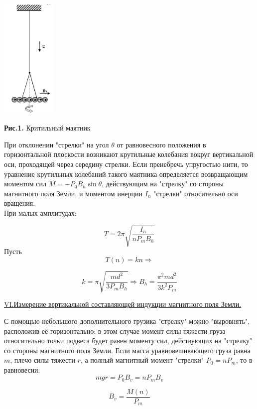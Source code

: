 \documentclass{article}
\begin{document}
\begin{center}
    \includegraphics[width = 0.2\textwidth]{Bhor.png}
    
    \textbf{Рис.1.} Критильный маятник
\end{center}

При отклонении "стрелки" на угол $\theta$ от равновесного положения в горизонтальной плоскости возникают крутильные колебания вокруг вертикальной оси, проходящей через середину стрелки. Если пренебречь упругостью нити, то уравнение крутильных колебаний такого маятника определяется возвращающим моментом сил $M = -P_0B_h \sin \theta$, действующим на "стрелку" со стороны магнитного поля Земли, и моментом инерции $I_n$ "стрелки" относительно оси вращения.\\
При малых амплитудах:

\[T = 2\pi \sqrt{\dfrac{I_n}{nP_mB_h}}\]
Пусть 
\[T(n) = kn \Rightarrow\]

\begin{equation}
    k = \pi \sqrt{\dfrac{md^2}{3P_m B_h}} \Rightarrow B_h = \dfrac{\pi^2md^2}{3k^2P_m}
\end{equation}

\begin{center}
    \underline{\large {\RN{6}.{Измерение вертикальной составляющей индукции магнитного поля Земли.}}}
\end{center}

С помощью небольшого дополнительного грузика "стрелку" можно "выровнять", расположив её горизонтально: в этом случае момент силы тяжести груза относительно точки подвеса будет равен моменту сил, действующих на "стрелку" со стороны магнитного поля Земли. Если масса уравновешивающего груза равна $m$, плечо силы тяжести $r$, а полный магнитный момент "стрелки" $P_0 = nP_m$, то в равновесии:
\[
    mgr = P_0 B_v = nP_mB_v
\]

\begin{equation}
    B_v = \dfrac{M(n)}{P_m}
\end{equation}
\end{document}
